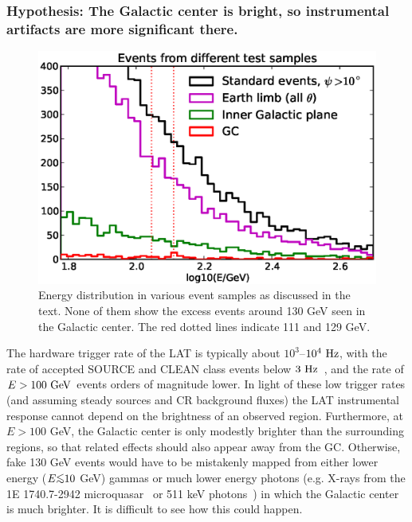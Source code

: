 \documentclass[aps,twocolumn,prd,superscriptaddress,showpacs,nofootinbib,fixfloat]{revtex4}
\newcommand{\Hz}{{\rm ~Hz}}
\newcommand{\GeV}{{\rm ~GeV}}
\def\la{\vcenter{\hbox{$<$}\offinterlineskip\hbox{$\sim$}}}
\begin{document}
\subsubsection{Hypothesis: The Galactic center is bright, so
instrumental artifacts are more significant there.}

\begin{figure}
  \centering
  \includegraphics[width=1.0\linewidth]{plots/target_spectra.eps}
  \caption{Energy distribution in various event samples 
      as
  discussed in the text. None of them show the excess events
  around 130 GeV seen in the Galactic center. The red dotted
  lines indicate 111 and 129 GeV.}
  \label{fig:target_spectra}
\end{figure}

The hardware trigger rate of the LAT is typically
about $10^3$--$10^4\Hz$, with the rate of
accepted SOURCE and CLEAN class events below
$3\Hz$~\citep{collaboration:2012kca}, and the rate of $E>100\GeV$ events
orders of magnitude lower. In light of these low trigger rates
(and assuming steady sources and CR background fluxes) the
LAT instrumental response cannot
depend on the brightness of an observed region.
%
Furthermore, at $E > 100$ GeV, the Galactic center is only modestly brighter
than the surrounding regions, so that related effects should also appear away
from the GC. Otherwise, fake 130 GeV events would have to be mistakenly
mapped from either lower energy ($E \la 10$ GeV) gammas or much lower energy
photons (e.g.  X-rays from the 1E 1740.7-2942 microquasar~\cite{Gallo:2002} or
511 keV photons~\cite{Prantzos:2011}) in which the Galactic center is much
brighter.  It is difficult to see how this could happen.
\end{document}

